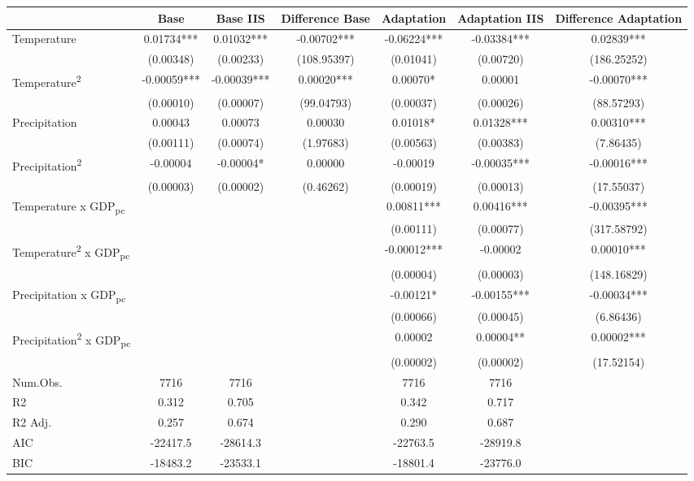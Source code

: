 \begin{table}
\centering
\begin{tabular}[t]{lcccccc}
\toprule
  & Base & Base IIS & Difference Base & Adaptation & Adaptation IIS & Difference Adaptation\\
\midrule
Temperature & 0.01734*** & 0.01032*** & -0.00702*** & -0.06224*** & -0.03384*** & 0.02839***\\
 & (0.00348) & (0.00233) & (108.95397) & (0.01041) & (0.00720) & (186.25252)\\
Temperature\textsuperscript{2} & -0.00059*** & -0.00039*** & 0.00020*** & 0.00070* & 0.00001 & -0.00070***\\
 & (0.00010) & (0.00007) & (99.04793) & (0.00037) & (0.00026) & (88.57293)\\
Precipitation & 0.00043 & 0.00073 & 0.00030 & 0.01018* & 0.01328*** & 0.00310***\\
 & (0.00111) & (0.00074) & (1.97683) & (0.00563) & (0.00383) & (7.86435)\\
Precipitation\textsuperscript{2} & -0.00004 & -0.00004* & 0.00000 & -0.00019 & -0.00035*** & -0.00016***\\
 & (0.00003) & (0.00002) & (0.46262) & (0.00019) & (0.00013) & (17.55037)\\
Temperature x GDP\textsubscript{pc} &  &  &  & 0.00811*** & 0.00416*** & -0.00395***\\
 &  &  &  & (0.00111) & (0.00077) & (317.58792)\\
Temperature\textsuperscript{2} x GDP\textsubscript{pc} &  &  &  & -0.00012*** & -0.00002 & 0.00010***\\
 &  &  &  & (0.00004) & (0.00003) & (148.16829)\\
Precipitation x GDP\textsubscript{pc} &  &  &  & -0.00121* & -0.00155*** & -0.00034***\\
 &  &  &  & (0.00066) & (0.00045) & (6.86436)\\
Precipitation\textsuperscript{2} x GDP\textsubscript{pc} &  &  &  & 0.00002 & 0.00004** & 0.00002***\\
 &  &  &  & (0.00002) & (0.00002) & (17.52154)\\
\midrule
Num.Obs. & 7716 & 7716 &  & 7716 & 7716 & \\
R2 & 0.312 & 0.705 &  & 0.342 & 0.717 & \\
R2 Adj. & 0.257 & 0.674 &  & 0.290 & 0.687 & \\
AIC & -22417.5 & -28614.3 &  & -22763.5 & -28919.8 & \\
BIC & -18483.2 & -23533.1 &  & -18801.4 & -23776.0 & \\

\end{tabular}
\end{table}
